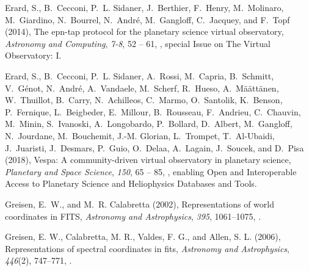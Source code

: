 \begin{thebibliography}{22}
Erard, S., B.~Cecconi, P.~L. Sidaner, J.~Berthier, F.~Henry, M.~Molinaro,
  M.~Giardino, N.~Bourrel, N.~Andr{\'e}, M.~Gangloff, C.~Jacquey, and F.~Topf
  (2014), The epn-tap protocol for the planetary science virtual observatory,
  \textit{Astronomy and Computing}, \textit{7-8}, 52 -- 61,
  , special Issue on The
  Virtual Observatory: I.

Erard, S., B.~Cecconi, P.~L. Sidaner, A.~Rossi, M.~Capria, B.~Schmitt,
  V.~G\'enot, N.~Andr\'e, A.~Vandaele, M.~Scherf, R.~Hueso,
  A.~M{\"a}{\"a}tt{\"a}nen, W.~Thuillot, B.~Carry, N.~Achilleos, C.~Marmo,
  O.~Santolik, K.~Benson, P.~Fernique, L.~Beigbeder, E.~Millour, B.~Rousseau,
  F.~Andrieu, C.~Chauvin, M.~Minin, S.~Ivanoski, A.~Longobardo, P.~Bollard,
  D.~Albert, M.~Gangloff, N.~Jourdane, M.~Bouchemit, J.-M. Glorian, L.~Trompet,
  T.~Al-Ubaidi, J.~Juaristi, J.~Desmars, P.~Guio, O.~Delaa, A.~Lagain,
  J.~Soucek, and D.~Pisa (2018), Vespa: A community-driven virtual observatory
  in planetary science, \textit{Planetary and Space Science}, \textit{150}, 65
  -- 85, , enabling Open and
  Interoperable Access to Planetary Science and Heliophysics Databases and
  Tools.

{Greisen}, E.~W., and M.~R. {Calabretta} (2002), {Representations of world
  coordinates in FITS}, \textit{Astronomy and Astrophysics}, \textit{395},
  1061--1075, .

{Greisen, E. W.}, {Calabretta, M. R.}, {Valdes, F. G.}, and {Allen, S. L.}
  (2006), Representations of spectral coordinates in fits, \textit{Astronomy
  and Astrophysics}, \textit{446}(2), 747--771,
  .


\end{thebibliography}
